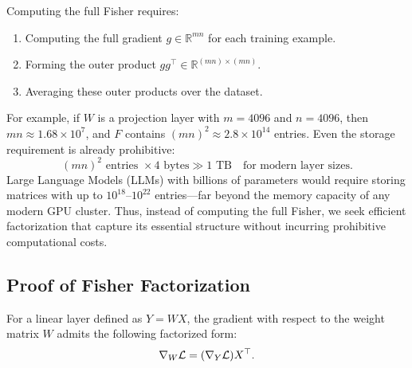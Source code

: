 \documentclass{article}
\theoremstyle{plain}
\theoremstyle{definition}
\theoremstyle{remark}
\begin{document}
Computing the full Fisher requires:
\begin{enumerate}
    \item Computing the full gradient $g \in \mathbb{R}^{mn}$ for each training example.
    \item Forming the outer product $g g^\top \in \mathbb{R}^{(mn)\times(mn)}$.
    \item Averaging these outer products over the dataset.
\end{enumerate}

For example, if $W$ is a projection layer with $m=4096$ and $n=4096$, then $mn \approx 1.68\times 10^{7}$, and $F$ contains $(mn)^2 \approx 2.8\times 10^{14}$ entries. Even the storage requirement is already prohibitive:
$$ (mn)^2 \text{ entries } \times 4\text{ bytes} \gg 1\text{ TB} \quad \text{for modern layer sizes}. $$
Large Language Models (LLMs) with billions of parameters would require storing matrices with up to $10^{18} \text{--} 10^{22}$ entries—far beyond the memory capacity of any modern GPU cluster. Thus, instead of computing the full Fisher, we seek efficient factorization that capture its essential structure without incurring prohibitive computational costs.


\subsection{Proof of Fisher Factorization}
\label{appendix_subsection:proof_gradient_factorization_identity}

\begin{tcolorbox}[colback=gray!10,colframe=gray!100]
\label{lemma:gradient_factorization_identity}

For a linear layer defined as $Y = WX$, the gradient with respect to the weight matrix $W$ admits the following factorized form:
\begin{align}
\nabla_{W} \mathcal{L} = (\nabla_Y \mathcal{L}) X^\top. \notag
\end{align}
\endlemma
\end{tcolorbox}
\end{document}
